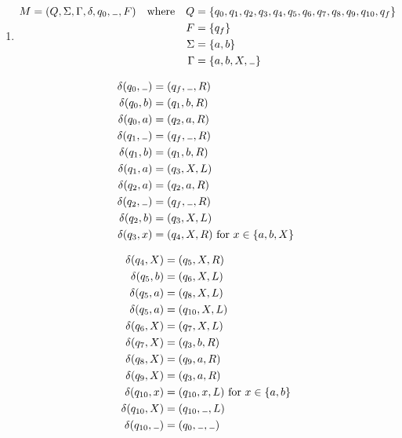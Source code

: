 \documentclass[11pt,a4paper,twoside]{article}
\newcommand\blank[1][.6em]{%
  \makebox[#1]{%
    \kern.07em
    \vrule height.3ex
    \hrulefill%
    \vrule height.3ex
    \kern.07em
  }%
}
\newcommand{\transition}[5]{\delta(#1,#2) &= (#3,#4,#5)}
\begin{document}
\begin{enumerate}
\begin{enumerate}
    \item %
    \begin{align*}
      M = (Q,\Sigma,\Gamma,\delta,q_0,\blank,F) \quad \mathrm{where} \quad
        Q &= \{q_0,q_1,q_2,q_3,q_4,q_5,q_6,q_7,q_8,q_9,q_{10},q_f\} \\
        F &= \{q_f\} \\
        \Sigma &= \{a,b\} \\
        \Gamma &= \{a,b,X,\blank\} \\
    \end{align*}
    \begin{multicols}{2}
    \begin{align*}
      \transition{q_0}{\blank}{q_f}{\blank}{R} \\
      \transition{q_0}{b}{q_1}{b}{R} \\
      \transition{q_0}{a}{q_2}{a}{R} \\
      \transition{q_1}{\blank}{q_f}{\blank}{R} \\
      \transition{q_1}{b}{q_1}{b}{R} \\
      \transition{q_1}{a}{q_3}{X}{L} \\
      \transition{q_2}{a}{q_2}{a}{R} \\
      \transition{q_2}{\blank}{q_f}{\blank}{R} \\
      \transition{q_2}{b}{q_3}{X}{L} \\
      \transition{q_3}{x}{q_4}{X}{R} \ \mathrm{for} \ x \in \{a,b,X\} \\
    \end{align*}

    \begin{align*}
      \transition{q_4}{X}{q_5}{X}{R} \\
      \transition{q_5}{b}{q_6}{X}{L} \\
      \transition{q_5}{a}{q_8}{X}{L} \\
      \transition{q_5}{a}{q_{10}}{X}{L} \\
      \transition{q_6}{X}{q_7}{X}{L} \\
      \transition{q_7}{X}{q_3}{b}{R} \\
      \transition{q_8}{X}{q_9}{a}{R} \\
      \transition{q_9}{X}{q_3}{a}{R} \\
      \transition{q_{10}}{x}{q_{10}}{x}{L} \ \mathrm{for} \ x \in \{a,b\} \\
      \transition{q_{10}}{X}{q_{10}}{\blank}{L} \\
      \transition{q_{10}}{\blank}{q_0}{\blank}{\blank} \\
    \end{align*}
  \end{multicols}
  \end{enumerate}


\end{enumerate}
\end{document}
